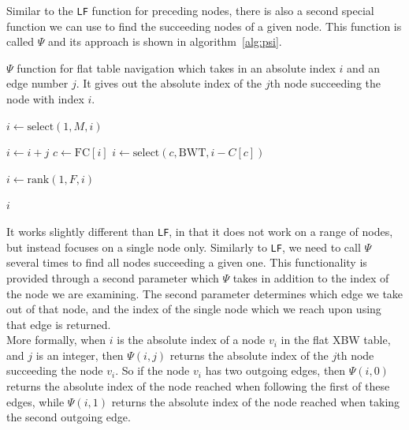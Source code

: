 \documentclass[a4paper,12pt,twoside,BCOR=10mm]{scrbook}
\begin{document}
Similar to the \texttt{LF} function for preceding nodes, there is also a second special function we can use 
to find the succeeding nodes of a given node. 
This function is called $ \Psi $ and its approach is shown in algorithm~\ref{alg:psi}. 
\begin{algorithm}
\caption[$ \Psi $ function for flat table navigation]{$ \Psi $ function for flat table navigation which takes in an absolute index $ i $ and an edge number $ j $. It gives out the absolute index of the $ j $th node succeeding the node with index $ i $.}
\label{alg:psi}
\begin{algorithmic}[1]

\State $ i \gets \textrm{select}(1, M, i) $

\State \phantom{nl}

\State $ i \gets i + j $
\State $ c \gets \textrm{FC} [ i ] $
\State $ i \gets \textrm{select}(c, \textrm{BWT}, i - C [ c ]) $

\State \phantom{nl}

\State $ i \gets \textrm{rank}(1, F, i) $

\State \phantom{nl}

\State \Return $ i $

\end{algorithmic}
\end{algorithm}
It works slightly different than \texttt{LF}, 
in that it does not work on a range of nodes, but instead focuses on a single node only. 
Similarly to \texttt{LF}, we need to call $ \Psi $ several times to find all nodes succeeding a given one. 
This functionality is provided through a second parameter which $ \Psi $ takes 
in addition to the index of the node we are examining. 
The second parameter determines which edge we take out of that node, 
and the index of the single node which we reach upon using that edge is returned. \\
More formally, when $ i $ is the absolute index of a node $ v_i $ in the flat XBW table, 
and $ j $ is an integer, then $ \Psi (i, j) $ returns the absolute index of the $ j $th node 
succeeding the node $ v_i $. So if the node $ v_i $ has two outgoing edges, 
then $ \Psi (i, 0) $ returns the absolute index of the node reached when following 
the first of these edges, while $ \Psi (i, 1) $ returns the absolute index of the node reached when 
taking the second outgoing edge. \\
\end{document}
